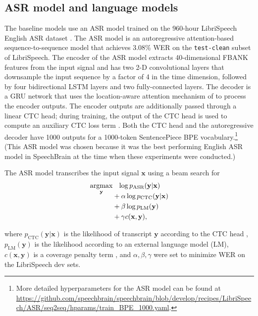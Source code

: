 \documentclass{article}
\newcommand{\argmax}{\operatornamewithlimits{argmax}} \usepackage{subcaption}
\begin{document}
\subsection{ASR model and language models}\label{ASR}
The baseline models use an ASR model trained on the 960-hour LibriSpeech English ASR dataset \cite{librispeech}. The ASR model is an autoregressive attention-based sequence-to-sequence model \cite{bahdanau2014neural, chan2016listen} that achieves 3.08\% WER on the \texttt{test-clean} subset of LibriSpeech. The encoder of the ASR model extracts 40-dimensional FBANK features from the input signal and has two 2-D convolutional layers that downsample the input sequence by a factor of 4 in the time dimension, followed by four bidirectional LSTM layers and two fully-connected layers. The decoder is a GRU network that uses the location-aware attention mechanism of \cite{chorowski2015attention} to process the encoder outputs. The encoder outputs are additionally passed through a linear CTC \cite{Graves2006} head; during training, the output of the CTC head is used to compute an auxiliary CTC loss term \cite{kim2017joint}. Both the CTC head and the autoregressive decoder have 1000 outputs for a 1000-token SentencePiece \cite{kudo2018sentencepiece} BPE vocabulary.\footnote{More detailed hyperparameters for the ASR model can be found at \url{https://github.com/speechbrain/speechbrain/blob/develop/recipes/LibriSpeech/ASR/seq2seq/hparams/train_BPE_1000.yaml}.} (This ASR model was chosen because it was the best performing English ASR model in SpeechBrain at the time when these experiments were conducted.)

The ASR model transcribes the input signal $\mathbf{x}$ using a beam search for
\begin{align*}
    \argmax_{\mathbf{y}} & \phantom{+}\log p_{\text{ASR}}(\mathbf{y}|\mathbf{x})\\[-0.75em]
    &+ \alpha \log p_{\text{CTC}}(\mathbf{y}|\mathbf{x})\\
    &+ \beta \log p_{\text{LM}}(\mathbf{y})\\
    &+ \gamma c(\mathbf{x}, \mathbf{y}),
\end{align*}

where $p_{\text{CTC}}(\mathbf{y}|\mathbf{x})$ is the likelihood of transcript $\mathbf{y}$  according to the CTC head \cite{kim2017joint},
$p_{\text{LM}}(\mathbf{y})$ is the likelihood according to an external language model (LM), $c(\mathbf{x}, \mathbf{y})$ is a coverage penalty term \cite{kannan2018analysis}, and $\alpha, \beta, \gamma$ were set to minimize WER on the LibriSpeech dev sets.
\end{document}
